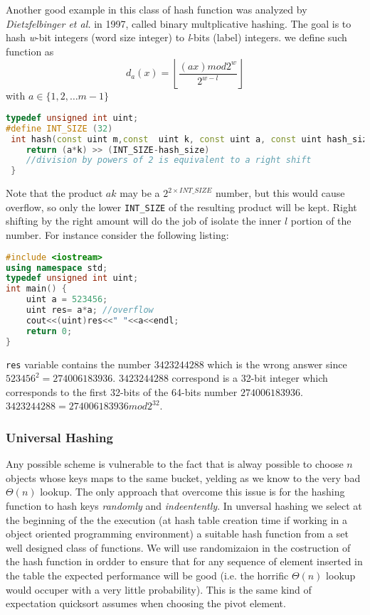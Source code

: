 Another good example in this class of hash function was analyzed by \textit{Dietzfelbinger et al.} in 1997, called binary multplicative hashing. The goal is to hash \textit{w}-bit integers (word size integer) to \textit{l}-bits (label) integers. 
we define such function as 
\[
d_a (x) = \left \lfloor{\frac{(ax) mod 2^w}{2^{w-l}}}\right \rfloor 
\]
with $a \in \{1,2,\ldots m-1\}$

\begin{lstlisting}[language=c++, caption="Multiplicative method hashing"]
typedef unsigned int uint;
#define INT_SIZE (32)
 int hash(const uint m,const  uint k, const uint a, const uint hash_size) {
 	return (a*k) >> (INT_SIZE-hash_size) 
 	//division by powers of 2 is equivalent to a right shift
 }

\end{lstlisting}
Note that the product $ak$ may be a $2^{2 \times INT\_SIZE}$ number, but this would cause overflow, so only the lower \texttt{INT\_SIZE} of the resulting product will be kept. Right shifting by the right amount will do the job of isolate the inner $l$ portion of the number. 
For instance consider the following listing:

\begin{lstlisting}[language=c++]
#include <iostream>
using namespace std;
typedef unsigned int uint;
int main() {
	uint a = 523456;
	uint res= a*a; //overflow
	cout<<(uint)res<<" "<<a<<endl;
	return 0;
}
\end{lstlisting}
\texttt{res} variable contains the number $3423244288$ which is the wrong answer since $523456^2=274006183936$. $3423244288$ correspond is a 32-bit integer which corresponds to the first 32-bits of the 64-bits number $274006183936$. $3423244288 = 274006183936 mod 2^{32}$.

\subsubsection{Universal Hashing}

Any possible scheme is vulnerable to the fact that is alway possible to choose $n$ objects whose keys maps to the same bucket, yelding as we know to the very bad $\Theta(n)$ lookup. The only approach that overcome this issue is for the hashing function to hash keys \textit{randomly} and \textit{indeentently}. In unversal hashing we select at the beginning of the the execution (at hash table  creation time if working in a object oriented programming environment) a suitable hash function from a set well designed class of functions. We will use randomizaion in the costruction of the hash function in ordder to ensure that for any sequence of element inserted in the table the expected performance will be good (i.e. the horrific $\Theta(n)$ lookup would occuper with a very little probability). This is the same kind of expectation quicksort assumes when choosing the pivot element.

